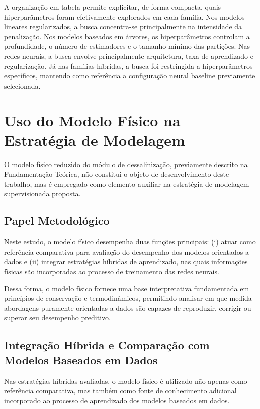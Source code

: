 A organização em tabela permite explicitar, de forma compacta, quais hiperparâmetros foram efetivamente explorados em cada família. Nos modelos lineares regularizados, a busca concentra-se principalmente na intensidade da penalização. Nos modelos baseados em árvores, os hiperparâmetros controlam a profundidade, o número de estimadores e o tamanho mínimo das partições. Nas redes neurais, a busca envolve principalmente arquitetura, taxa de aprendizado e regularização. Já nas famílias híbridas, a busca foi restringida a hiperparâmetros específicos, mantendo como referência a configuração neural baseline previamente selecionada.

\section{Uso do Modelo Físico na Estratégia de Modelagem}

O modelo físico reduzido do módulo de dessalinização, previamente descrito na Fundamentação Teórica, não constitui o objeto de desenvolvimento deste trabalho, mas é empregado como elemento auxiliar na estratégia de modelagem supervisionada proposta.

\subsection{Papel Metodológico}

Neste estudo, o modelo físico desempenha duas funções principais: (i) atuar como referência comparativa para avaliação do desempenho dos modelos orientados a dados e (ii) integrar estratégias híbridas de aprendizado, nas quais informações físicas são incorporadas ao processo de treinamento das redes neurais.

Dessa forma, o modelo físico fornece uma base interpretativa fundamentada em princípios de conservação e termodinâmicos, permitindo analisar em que medida abordagens puramente orientadas a dados são capazes de reproduzir, corrigir ou superar seu desempenho preditivo.

\subsection{Integração Híbrida e Comparação com Modelos Baseados em Dados}

Nas estratégias híbridas avaliadas, o modelo físico é utilizado não apenas como referência comparativa, mas também como fonte de conhecimento adicional incorporado ao processo de aprendizado dos modelos baseados em dados.

